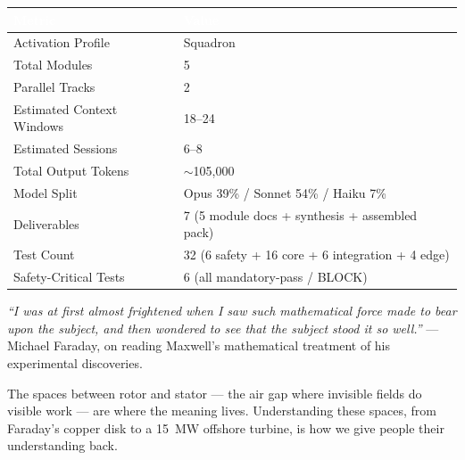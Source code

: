 \documentclass[11pt,letterpaper]{article}
\newcommand{\tableheader}[1]{\textbf{\sffamily\textcolor{white}{#1}}}
\begin{document}
\begin{center}
\begin{tabularx}{\textwidth}{L{5cm}X}
\toprule
{}
\tableheader{Metric} & \tableheader{Value} \\
\midrule
Activation Profile & Squadron \\
Total Modules & 5 \\
Parallel Tracks & 2 \\
Estimated Context Windows & 18--24 \\
Estimated Sessions & 6--8 \\
Total Output Tokens & $\sim$105,000 \\
Model Split & Opus 39\% / Sonnet 54\% / Haiku 7\% \\
Deliverables & 7 (5 module docs + synthesis + assembled pack) \\
Test Count & 32 (6 safety + 16 core + 6 integration + 4 edge) \\
Safety-Critical Tests & 6 (all mandatory-pass / BLOCK) \\
\bottomrule
\end{tabularx}
\end{center}

\vspace{1em}

\begin{quotebox}
\emph{``I was at first almost frightened when I saw such mathematical force made to bear upon the subject, and then wondered to see that the subject stood it so well.''} --- Michael Faraday, on reading Maxwell's mathematical treatment of his experimental discoveries.

\vspace{0.5em}

The spaces between rotor and stator --- the air gap where invisible fields do visible work --- are where the meaning lives. Understanding these spaces, from Faraday's copper disk to a 15~MW offshore turbine, is how we give people their understanding back.
\end{quotebox}
\end{document}
